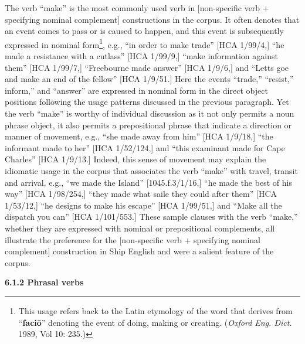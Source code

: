 \documentclass[12pt]{article}
\newcommand\textstyleStrong[1]{\textbf{#1}}
\newenvironment{styleStandard}{\renewcommand\baselinestretch{1.0}\setlength\leftskip{0cm}\setlength\rightskip{0cm plus 1fil}\setlength\parindent{0cm}\setlength\parfillskip{0pt plus 1fil}\setlength\parskip{0in plus 1pt}\writerlistparindent\writerlistleftskip\leavevmode\normalfont\normalsize\writerlistlabel\ignorespaces}{\unskip\vspace{0in plus 1pt}\par}
\newcommand\writerlistleftskip{}
\newcommand\writerlistparindent{}
\newcommand\writerlistlabel{}
\begin{document}
\begin{styleStandard}
The verb “make” is the most commonly used verb in [non-specific verb + specifying nominal complement] constructions in the corpus. It often denotes that an event comes to pass or is caused to happen, and this event is subsequently expressed in nominal form\footnote{ This usage refers back to the Latin etymology of the word that derives from “\textstyleStrong{faci\=o}” denoting the event of doing, making or creating. (\textit{Oxford Eng. Dict. }1989, Vol 10: 235.) }, e.g., “in order to make trade” [HCA 1/99/4,] “he made a resistance with a cutlass” [HCA 1/99/9,] “make information against them” [HCA 1/99/7,] “Freebourne made answer” [HCA 1/9/6,] and “Letts goe and make an end of the fellow” [HCA 1/9/51.] Here the events “trade,” “resist,” inform,” and “answer” are expressed in nominal form in the direct object positions following the usage patterns discussed in the previous paragraph. Yet the verb “make” is worthy of individual discussion as it not only permits a noun phrase object, it also permits a prepositional phrase that indicate a direction or manner of movement, e.g., “she made away from him” [HCA 1/9/18,] “the informant made to her” [HCA 1/52/124,] and “this examinant made for Cape Charles” [HCA 1/9/13.] Indeed, this sense of movement may explain the idiomatic usage in the corpus that associates the verb “make” with travel, transit and arrival, e.g., “we made the Island” [1045.f.3/1/16,] “he made the best of his way” [HCA 1/98/254,] “they made what saile they could after them” [HCA 1/53/12,] “he designs to make his escape” [HCA 1/99/51,] and “Make all the dispatch you can” [HCA 1/101/553.] These sample clauses with the verb “make,” whether they are expressed with nominal or prepositional complements, all illustrate the preference for the [non-specific verb + specifying nominal complement] construction in Ship English and were a salient feature of the corpus. 
\end{styleStandard}


\begin{styleStandard}
\textbf{6.1.2 Phrasal verbs}
\end{styleStandard}
\end{document}
